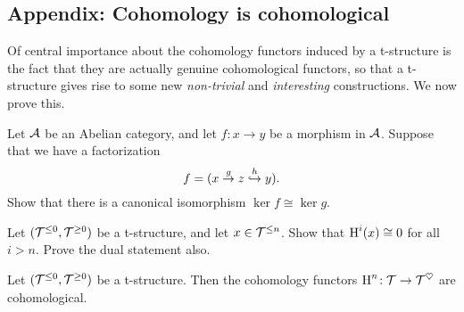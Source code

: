 \subsection{Appendix: Cohomology is cohomological}
Of central importance about the cohomology functors induced by a t-structure is the fact that they are actually genuine cohomological functors, so
that a t-structure gives rise to some new \emph{non-trivial} and \emph{interesting} constructions. We now prove this.
\begin{exercise}\label{exercise:abelian-category-kernel-invariant-under-composition-with-monic}
	Let \(\mathcal{A}\) be an Abelian category, and let \(f\!:x\to y\) be a morphism in \(\mathcal{A}\). Suppose that we have a factorization
	\[ f = (x \overset{g}\to z \overset{h}{\hookrightarrow} y). \]
	Show that there is a canonical isomorphism \(\ker{f} \cong \ker{g}\).
\end{exercise}
\begin{exercise}\label{exercise:t-structure-cohomology-of-object-in-aisle}
	Let \((\mathcal{T}^{\leq 0},\mathcal{T}^{\geq 0})\) be a t-structure, and let \(x\in\mathcal{T}^{\leq n}\). Show that \(\operatorname{H}^i(x) \cong 0\) for all \(i > n\). Prove the dual statement also.
\end{exercise}
\begin{theorem}\label{thm:t-structure-cohomology-is-cohomological}
	Let \((\mathcal{T}^{\leq 0},\mathcal{T}^{\geq 0})\) be a t-structure. Then the cohomology functors \(\operatorname{H}^n\!:\mathcal{T}\to\mathcal{T}^{\heartsuit}\) are cohomological.
\end{theorem}
